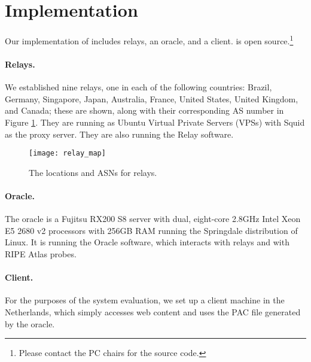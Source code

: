 \section{Implementation}

Our implementation of \system{} includes relays, an oracle, and 
a client. \system{} is open source.\footnote{Please
  contact the PC chairs for the source code.}

\paragraph{Relays.}  We established nine relays, one in each of the following countries: Brazil, 
Germany, Singapore, Japan, Australia, France, United States, United Kingdom, and Canada; these 
are shown, along with their corresponding AS number in Figure \ref{fig:relay_locations}.  
They are running as Ubuntu Virtual Private Servers (VPSs) with 
Squid as the proxy server.  They are also running the \system{} Relay software.

\begin{figure}[t!]
\centering
\texttt{[image: relay\_map]}
\caption{The locations and ASNs for \system{} relays.}
\label{fig:relay_locations}
\end{figure}

\paragraph{Oracle.}  The oracle is a Fujitsu RX200 S8 server with dual, 
eight-core 2.8GHz Intel Xeon E5 2680 v2 processors with 256GB RAM running the 
Springdale distribution of Linux. It is running the \system{} Oracle software, 
which interacts with relays and with RIPE Atlas probes.

\paragraph{Client.} For the purposes of the system evaluation, we set up a client 
machine in the Netherlands, which simply accesses web content and uses the PAC 
file generated by the oracle. 
